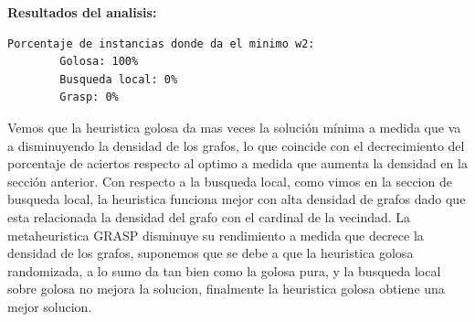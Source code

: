 \textbf{Resultados del analisis:}
\begin{lstlisting}[frame=single]	
	Porcentaje de instancias donde da el minimo w2:
		Golosa: 100%
		Busqueda local: 0%
		Grasp: 0%
\end{lstlisting}

Vemos que la heuristica golosa da mas veces la soluci\'on m\'inima a medida que va a disminuyendo la densidad de los grafos, lo que coincide con el decrecimiento del porcentaje de aciertos respecto al optimo a medida que aumenta la densidad en la secci\'on anterior.
Con respecto a la busqueda local, como vimos en la seccion de busqueda local, la heuristica funciona mejor con alta densidad de grafos dado que esta relacionada la densidad del grafo con el cardinal de la vecindad. La metaheuristica GRASP disminuye su rendimiento a medida que decrece la densidad de los grafos, suponemos que se debe a que la heuristica golosa randomizada, a lo sumo da tan bien como la golosa pura, y la busqueda local sobre golosa no mejora la solucion, finalmente la heuristica golosa obtiene una mejor solucion.